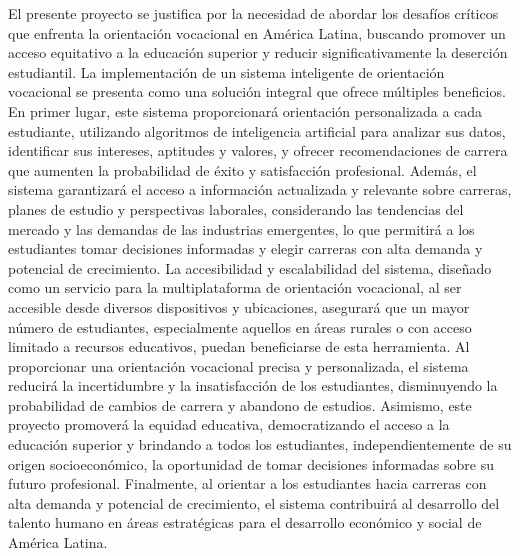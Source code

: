 El presente proyecto se justifica por la necesidad de abordar los desafíos críticos que enfrenta la orientación vocacional en América Latina, buscando promover un acceso equitativo a la educación superior y reducir significativamente la deserción estudiantil. La implementación de un sistema inteligente de orientación vocacional se presenta como una solución integral que ofrece múltiples beneficios. En primer lugar, este sistema proporcionará orientación personalizada a cada estudiante, utilizando algoritmos de inteligencia artificial para analizar sus datos, identificar sus intereses, aptitudes y valores, y ofrecer recomendaciones de carrera que aumenten la probabilidad de éxito y satisfacción profesional. Además, el sistema garantizará el acceso a información actualizada y relevante sobre carreras, planes de estudio y perspectivas laborales, considerando las tendencias del mercado y las demandas de las industrias emergentes, lo que permitirá a los estudiantes tomar decisiones informadas y elegir carreras con alta demanda y potencial de crecimiento. La accesibilidad y escalabilidad del sistema, diseñado como un servicio para la multiplataforma de orientación vocacional, al ser accesible desde diversos dispositivos y ubicaciones, asegurará que un mayor número de estudiantes, especialmente aquellos en áreas rurales o con acceso limitado a recursos educativos, puedan beneficiarse de esta herramienta. Al proporcionar una orientación vocacional precisa y personalizada, el sistema reducirá la incertidumbre y la insatisfacción de los estudiantes, disminuyendo la probabilidad de cambios de carrera y abandono de estudios. Asimismo, este proyecto promoverá la equidad educativa, democratizando el acceso a la educación superior y brindando a todos los estudiantes, independientemente de su origen socioeconómico, la oportunidad de tomar decisiones informadas sobre su futuro profesional. Finalmente, al orientar a los estudiantes hacia carreras con alta demanda y potencial de crecimiento, el sistema contribuirá al desarrollo del talento humano en áreas estratégicas para el desarrollo económico y social de América Latina.